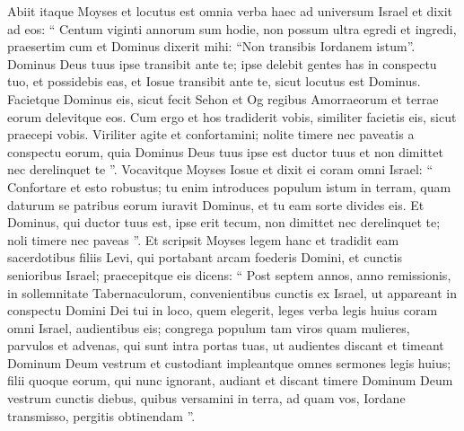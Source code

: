\begin{biblechapter}
\begin{biblechapter}
\begin{biblechapter}
\begin{biblechapter}
\begin{biblechapter}
\begin{biblechapter}
\begin{biblechapter}
\begin{biblechapter}
\begin{biblechapter}
\begin{biblechapter}
\begin{biblechapter}
\begin{biblechapter}
\begin{biblechapter}
\begin{biblechapter}
\begin{biblechapter}
\begin{biblechapter}
\begin{biblechapter}
\begin{biblechapter}
\begin{biblechapter}
\begin{biblechapter}
\begin{biblechapter}
\begin{biblechapter}
\begin{biblechapter}
\begin{biblechapter}
\begin{biblechapter}
\begin{biblechapter}
\begin{biblechapter}
\begin{biblechapter}
\begin{biblechapter}
\begin{biblechapter}
\begin{biblechapter}
\verse Abiit itaque Moyses et locutus est omnia verba haec ad universum Israel 
\verse et dixit ad eos: “ Centum viginti annorum sum hodie, non possum ultra egredi et ingredi, praesertim cum et Dominus dixerit mihi: “Non transibis Iordanem istum”. 
\verse Dominus Deus tuus ipse transibit ante te; ipse delebit gentes has in conspectu tuo, et possidebis eas, et Iosue transibit ante te, sicut locutus est Dominus. 
\verse Facietque Dominus eis, sicut fecit Sehon et Og regibus Amorraeorum et terrae eorum delevitque eos. 
\verse Cum ergo et hos tradiderit vobis, similiter facietis eis, sicut praecepi vobis. 
\verse Viriliter agite et confortamini; nolite timere nec paveatis a conspectu eorum, quia Dominus Deus tuus ipse est ductor tuus et non dimittet nec derelinquet te ”.
 \verse Vocavitque Moyses Iosue et dixit ei coram omni Israel: “ Confortare et esto robustus; tu enim introduces populum istum in terram, quam daturum se patribus eorum iuravit Dominus, et tu eam sorte divides eis. 
\verse Et Dominus, qui ductor tuus est, ipse erit tecum, non dimittet nec derelinquet te; noli timere nec paveas ”.
 \verse Et scripsit Moyses legem hanc et tradidit eam sacerdotibus filiis Levi, qui portabant arcam foederis Domini, et cunctis senioribus Israel; 
\verse praecepitque eis dicens: “ Post septem annos, anno remissionis, in sollemnitate Tabernaculorum, 
\verse convenientibus cunctis ex Israel, ut appareant in conspectu Domini Dei tui in loco, quem elegerit, leges verba legis huius coram omni Israel, audientibus eis; 
\verse congrega populum tam viros quam mulieres, parvulos et advenas, qui sunt intra portas tuas, ut audientes discant et timeant Dominum Deum vestrum et custodiant impleantque omnes sermones legis huius; 
 \verse filii quoque eorum, qui nunc ignorant, audiant et discant timere Dominum Deum vestrum cunctis diebus, quibus versamini in terra, ad quam vos, Iordane transmisso, pergitis obtinendam ”.

\end{biblechapter}
\end{biblechapter}
\end{biblechapter}
\end{biblechapter}
\end{biblechapter}
\end{biblechapter}
\end{biblechapter}
\end{biblechapter}
\end{biblechapter}
\end{biblechapter}
\end{biblechapter}
\end{biblechapter}
\end{biblechapter}
\end{biblechapter}
\end{biblechapter}
\end{biblechapter}
\end{biblechapter}
\end{biblechapter}
\end{biblechapter}
\end{biblechapter}
\end{biblechapter}
\end{biblechapter}
\end{biblechapter}
\end{biblechapter}
\end{biblechapter}
\end{biblechapter}
\end{biblechapter}
\end{biblechapter}
\end{biblechapter}
\end{biblechapter}
\end{biblechapter}
